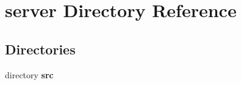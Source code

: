 \section{server Directory Reference}
\label{dir_41e1742e44e2de38b3bc91f993fed282}
\subsection*{Directories}
\begin{DoxyCompactItemize}
\item 
directory {\bf src}
\end{DoxyCompactItemize}
